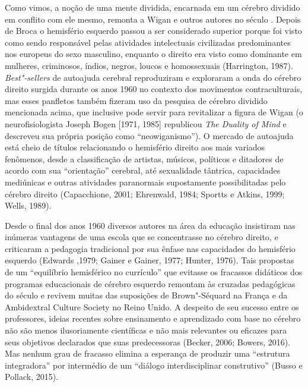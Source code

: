 Como vimos, a noção de uma mente dividida, encarnada em um cérebro
dividido em conflito com ele mesmo, remonta a Wigan e outros autores no
século . Depois de Broca o hemisfério esquerdo passou a ser
considerado superior porque foi visto como sendo responsável pelas
atividades intelectuais civilizadas predominantes nos europeus do sexo
masculino, enquanto o direito era visto como dominante em mulheres,
criminosos, índios, negros, loucos e homossexuais (Harrington, 1987).
\emph{Best"-sellers} de autoajuda cerebral reproduziram e exploraram a
onda do cérebro direito surgida durante os anos 1960 no contexto dos
movimentos contraculturais, mas esses panfletos também fizeram uso da
pesquisa de cérebro dividido mencionada acima, que inclusive pode servir
para revitalizar a figura de Wigan (o neurofisiologista Joseph Bogen
{[}1971, 1985{]} republicou \emph{The Duality of Mind} e descreveu sua
própria posição como ``neowiganismo''). O mercado de autoajuda está
cheio de títulos relacionando o hemisfério direito aos mais variados
fenômenos, desde a classificação de artistas, músicos, políticos e
ditadores de acordo com sua ``orientação'' cerebral, até sexualidade
tântrica, capacidades mediúnicas e outras atividades paranormais
supostamente possibilitadas pelo cérebro direito (Capacchione, 2001;
Ehrenwald, 1984; Sportts e Atkins, 1999; Wells, 1989).

Desde o final dos anos 1960 diversos autores na área da educação
insistiram nas inúmeras vantagens de uma escola que se concentrasse no
cérebro direito, e criticaram a pedagogia tradicional por sua ênfase nas
capacidades do hemisfério esquerdo (Edwards ,1979; Gainer e Gainer,
1977; Hunter, 1976). Tais propostas de um ``equilíbrio hemisférico no
currículo'' que evitasse os fracassos didáticos dos programas
educacionais de cérebro esquerdo remontam às cruzadas pedagógicas do
século  e revivem muitas das suposições de Brown"-Séquard na França e
da Ambidextral Culture Society no Reino Unido. A despeito de seu sucesso
entre os professores, ideias recentes sobre ensinamento e aprendizado
com base no cérebro não são menos ilusoriamente científicas e não mais
relevantes ou eficazes para seus objetivos declarados que suas
predecessoras (Becker, 2006; Bowers, 2016). Mas nenhum grau de fracasso
elimina a esperança de produzir uma ``estrutura integradora'' por
intermédio de um ``diálogo interdisciplinar construtivo'' (Busso e
Pollack, 2015).

